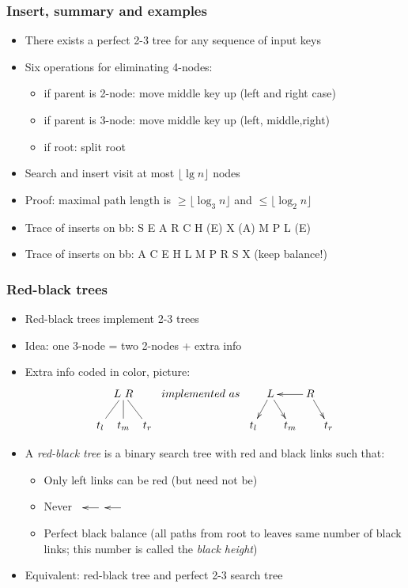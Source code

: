\documentclass[handout]{beamer}
\begin{document}
\begin{frame}
    \frametitle{Insert, summary and examples}

\begin{itemize}[<+->]
\item There exists a perfect 2-3 tree for any sequence of input keys 
\item Six operations for eliminating 4-nodes:
  \begin{itemize}[<+->]
  \item if parent is 2-node: move middle key up (left and right case)
  \item if parent is 3-node: move middle key up (left, middle,right)
  \item if root: split root
  \end{itemize}
\item Search and insert visit at most $\lfloor\lg n\rfloor$ nodes
\item Proof: maximal path length is $\geq \lfloor\log_3 n\rfloor$ 
and $\leq \lfloor\log_2 n\rfloor$
\item Trace of inserts on bb: S E A R C H (E) X (A) M P L (E)
\item Trace of inserts on bb: A C E H L M P  R S X (keep balance!)
\end{itemize}     
\end{frame}

\begin{frame}
    \frametitle{Red-black trees}

\begin{itemize}[<+->]
\item Red-black trees implement 2-3 trees
\item Idea: one 3-node = two 2-nodes + extra info
\item Extra info coded in color, picture:
\[\xymatrix@R=.5cm@C=.1cm{
&L\ar@{-}[dl]\ar@{-}[d]~R\ar@{-}[rd]&&implemented~as
&&L\ar@{>}[dl]\ar@{>}[rd]&&\ar@{>}@[red][ll]R\ar@{>}[rd]&\\
 t_l&t_m&t_r
&& t_l&&t_m&&t_r \\}
\]
\item A \emph{red-black tree} is a binary search tree with red and black
links such that: 
  \begin{itemize}[<+->]
  \item Only left links can be red (but need not be)
  \item Never $\xymatrix@R=.1cm@C=.5cm{&\ar@{>}@[red][l]&\ar@{>}@[red][l]}$
  \item Perfect black balance (all paths from root to leaves same number of black
  links; this number is called the \emph{black height})
  \end{itemize}
\item Equivalent: red-black tree and perfect 2-3 search tree
 \end{itemize}     
\end{frame}
\end{document}
